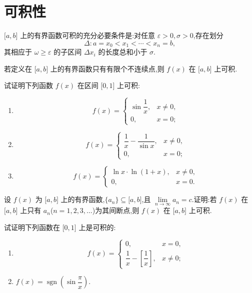 \documentclass[../数学分析培优讲义.tex]{subfiles}
\begin{document}
\newpage

\section{可积性}

\begin{theorem}[\markstar]
$\lbrack a,b\rbrack$ 上的有界函数可积的充分必要条件是:对任意 $\varepsilon>0,\sigma>0$,存在划分
\[
    \Delta:a=x_0<x_1<\cdots<x_n=b,
\]
其相应于 $\omega\geq\varepsilon$ 的子区间 $\Delta x_i$ 的长度总和小于 $\sigma$.
\end{theorem}

\begin{corollary}[\markstar]
若定义在 $\lbrack a,b\rbrack$ 上的有界函数只有有限个不连续点,则 $f(x)$ 在 $\lbrack a,b\rbrack$ 上可积.
\end{corollary}

\begin{example}
试证明下列函数 $f(x)$ 在区间 $\lbrack 0,1\rbrack$ 上可积:
\begin{enumerate}[label=(\arabic*)]
    \item
    \[
        f(x)=\begin{cases}
            \sin\dfrac{1}{x},&x\neq0,\\
            0,&x=0;
        \end{cases}
    \]
    \item
    \[
        f(x)=\begin{cases}
            \dfrac{1}{x}-\dfrac{1}{\sin x},&x\neq0,\\
            0,&x=0;
        \end{cases}
    \]
    \item
    \[
        f(x)=\begin{cases}
            \ln x\cdot\ln(1+x),&x\neq0,\\
            0,&x=0.
        \end{cases}
    \]
\end{enumerate}
\end{example}
\exampleblank

\begin{proposition}[\markstar]
设 $f(x)$ 为 $\lbrack a,b\rbrack$ 上的有界函数,$\{a_n\}\subseteq\lbrack a,b\rbrack$,且 $\displaystyle\lim\limits_{n\to\infty}a_n=c$.证明:若 $f(x)$ 在 $\lbrack a,b\rbrack$ 上只有 $a_n$($n=1,2,3,\ldots$)为其间断点,则 $f(x)$ 在 $\lbrack a,b\rbrack$ 上可积.
\end{proposition}

\begin{example}
试证明下列函数在 $\lbrack 0,1\rbrack$ 上是可积的:
\begin{enumerate}[label=(\arabic*)]
    \item
    \[
        f(x)=\begin{cases}
            0,&x=0,\\
            \dfrac{1}{x}-\left[\dfrac{1}{x}\right],&x\neq0;
        \end{cases}
    \]
    \item $f(x)=\operatorname{sgn}\left(\sin\dfrac{\pi}{x}\right)$.
\end{enumerate}
\end{example}
\exampleblank
\end{document}
